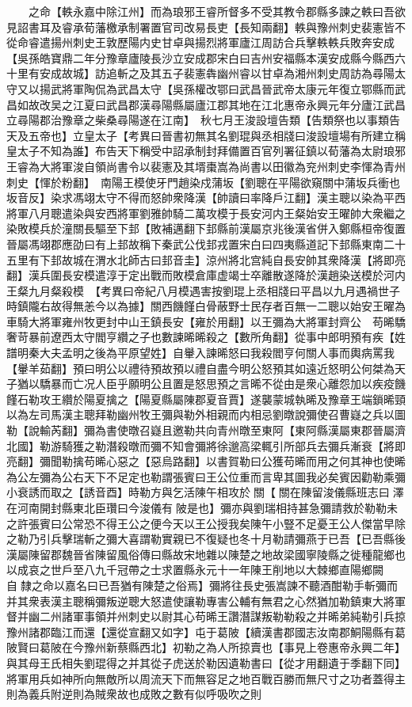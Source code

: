 　　之命【軼永嘉中除江州】而為琅邪王睿所督多不受其教令郡縣多諫之軼曰吾欲見詔書耳及睿承荀藩檄承制署置官司改易長吏【長知兩翻】軼與豫州刺史裴憲皆不從命睿遣揚州刺史王敦歷陽内史甘卓與揚烈將軍廬江周訪合兵擊軼軼兵敗奔安成【吳孫皓寶鼎二年分豫章廬陵長沙立安成郡宋白曰吉州安福縣本漢安成縣今縣西六十里有安成故城】訪追斬之及其五子裴憲犇幽州睿以甘卓為湘州刺史周訪為尋陽太守又以揚武將軍陶侃為武昌太守【吳孫權改鄂曰武昌晉武帝太康元年復立鄂縣而武昌如故改吴之江夏曰武昌郡漢尋陽縣屬廬江郡其地在江北惠帝永興元年分廬江武昌立尋陽郡治豫章之柴桑尋陽遂在江南】　秋七月王浚設壇告類【告類祭也以事類告天及五帝也】立皇太子【考異曰晉書初無其名劉琨與丞相牋曰浚設壇場有所建立稱皇太子不知為誰】布告天下稱受中詔承制封拜備置百官列署征鎮以荀藩為太尉琅邪王睿為大將軍浚自領尚書令以裴憲及其壻棗嵩為尚書以田徽為兖州刺史李惲為青州刺史【惲於粉翻】　南陽王模使牙門趙染戍蒲坂【劉聰在平陽欲窺關中蒲坂兵衝也坂音反】染求馮翊太守不得而怒帥衆降漢【帥讀曰率降戶江翻】漢主聰以染為平西將軍八月聰遣染與安西將軍劉雅帥騎二萬攻模于長安河内王粲始安王曜帥大衆繼之染敗模兵於潼關長驅至下邽【敗補邁翻下邽縣前漢屬京兆後漢省併入鄭縣桓帝復置晉屬馮翊郡應劭曰有上邽故稱下秦武公伐邽戎置宋白曰四夷縣道記下邽縣東南二十五里有下邽故城在渭水北師古曰邽音圭】涼州將北宫純自長安帥其衆降漢【將即亮翻】漢兵圍長安模遣淳于定出戰而敗模倉庫虚竭士卒離散遂降於漢趙染送模於河内王粲九月粲殺模　【考異曰帝紀八月模遇害按劉琨上丞相牋曰平昌以九月遇禍世子時鎮隴右故得無恙今以為據】關西饑饉白骨蔽野士民存者百無一二聰以始安王曜為車騎大將軍雍州牧更封中山王鎮長安【雍於用翻】以王彌為大將軍封齊公　苟晞驕奢苛暴前遼西太守閻亨纘之子也數諫晞晞殺之【數所角翻】從事中郎明預有疾【姓譜明秦大夫孟明之後為平原望姓】自轝入諫晞怒曰我殺閻亨何關人事而輿病罵我【轝羊茹翻】預曰明公以禮待預故預以禮自盡今明公怒預其如遠近怒明公何桀為天子猶以驕暴而亡况人臣乎願明公且置是怒思預之言晞不從由是衆心離怨加以疾疫饑饉石勒攻王纘於陽夏擒之【陽夏縣屬陳郡夏音賈】遂襲蒙城執晞及豫章王端鎖晞頸以為左司馬漢主聰拜勒幽州牧王彌與勒外相親而内相忌劉暾說彌使召曹嶷之兵以圖勒【說輸芮翻】彌為書使暾召嶷且邀勒共向青州暾至東阿【東阿縣漢屬東郡晉屬濟北國】勒游騎獲之勒潛殺暾而彌不知會彌將徐邈高梁輒引所部兵去彌兵漸衰【將即亮翻】彌聞勒擒苟晞心惡之【惡烏路翻】以書賀勒曰公獲苟晞而用之何其神也使晞為公左彌為公右天下不足定也勒謂張賓曰王公位重而言卑其圖我必矣賓因勸勒乘彌小衰誘而取之【誘音酉】時勒方與乞活陳午相攻於關【關在陳留浚儀縣班志曰澤在河南開封縣東北臣瓚曰今浚儀有陂是也】彌亦與劉瑞相持甚急彌請救於勒勒未之許張賓曰公常恐不得王公之便今天以王公授我矣陳午小豎不足憂王公人傑當早除之勒乃引兵擊瑞斬之彌大喜謂勒實親已不復疑也冬十月勒請彌燕于已吾【已吾縣後漢屬陳留郡魏晉省陳留風俗傳曰縣故宋地雜以陳楚之地故梁國寧陵縣之徙種龍鄉也以成哀之世戶至八九千冠帶之士求置縣永元十一年陳王削地以大棘鄉直陽鄉闕　　自隸之命以嘉名曰已吾猶有陳楚之俗焉】彌將往長史張嵩諫不聽酒酣勒手斬彌而并其衆表漢主聰稱彌叛逆聰大怒遣使讓勒專害公輔有無君之心然猶加勒鎮東大將軍督并幽二州諸軍事領并州刺史以尉其心苟晞王讚潛謀叛勒勒殺之并晞弟純勒引兵掠豫州諸郡臨江而還【還從宣翻又如字】屯于葛陂【續漢書郡國志汝南郡鮦陽縣有葛陂賢曰葛陂在今豫州新蔡縣西北】初勒之為人所掠賣也【事見上卷惠帝永興二年】與其母王氏相失劉琨得之并其從子虎送於勒因遺勒書曰【從才用翻遺于季翻下同】將軍用兵如神所向無敵所以周流天下而無容足之地百戰百勝而無尺寸之功者蓋得主則為義兵附逆則為賊衆故也成敗之數有似呼吸吹之則